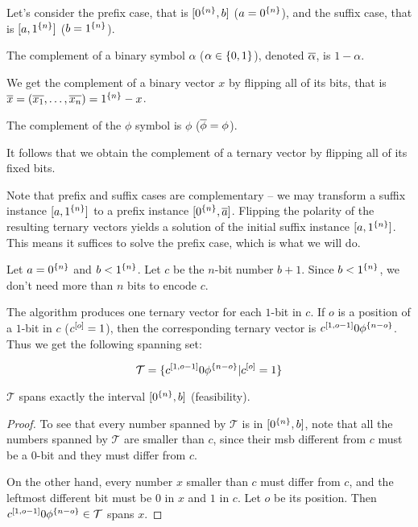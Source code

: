 Let's consider the prefix case,
that is $[0^{\{n\}}, b]$ ($a = 0^{\{n\}}$),
and the suffix case,
that is $[a, 1^{\{n\}}]$ ($b = 1^{\{n\}}$).

\begin{definition}[Complement]
The complement of a binary symbol $\alpha$
($\alpha \in \{0, 1\}$),
denoted $\overline{\alpha}$,
is $1 - \alpha$.

We get the complement of a binary vector $x$
by flipping all of its bits,
that is $\overline{x}
= (\overline{x_1}, \ldots, \overline{x_n})
= 1^{\{n\}} - x$.

The complement of the $\phi$ symbol is $\phi$
($\overline{\phi} = \phi$).

It follows that
we obtain the complement of a ternary vector
by flipping all of its fixed bits.
\end{definition}

Note that prefix and suffix cases are complementary --
we may transform a suffix instance
$[a, 1^{\{n\}}]$
to a prefix instance $[0^{\{n\}}, \overline{a}]$.
Flipping the polarity of the resulting ternary vectors
yields a solution of the initial suffix instance
$[a, 1^{\{n\}}]$.
This means it suffices to solve the prefix case,
which is what we will do.

Let $a = 0^{\{n\}}$ and $b < 1^{\{n\}}$.
Let $c$ be the $n$-bit number $b + 1$.
Since $b < 1^{\{n\}}$,
we don't need more than $n$ bits to encode $c$.

The algorithm produces one ternary vector
for each $1$-bit in $c$.
If $o$ is a position of a $1$-bit in $c$
($c^{[o]} = 1$),
then the corresponding ternary vector
is $c^{[1, o - 1]} 0 \phi^{\{n - o\}}$.
Thus we get the following spanning set:

\begin{equation*}
\mathcal{T} =
\{c^{[1, o - 1]} 0 \phi^{\{n - o\}} | c^{[o]} = 1\}
\end{equation*}

\begin{theorem}
$\mathcal{T}$ spans exactly the interval
$[0^{\{n\}}, b]$ (feasibility).
\end{theorem}

\begin{proof}
To see that every number spanned by $\mathcal{T}$
is in $[0^{\{n\}}, b]$,
note that all the numbers spanned by $\mathcal{T}$
are smaller than $c$,
since their \acrlong{msb} different from $c$
must be a $0$-bit
and they must differ from $c$.

On the other hand,
every number $x$ smaller than $c$ must differ from $c$,
and the leftmost different bit must be $0$ in $x$
and $1$ in $c$.
Let $o$ be its position.
Then
$c^{[1, o - 1]} 0 \phi^{\{n - o\}} \in \mathcal{T}$
spans $x$.
\end{proof}


